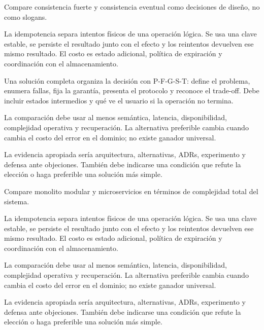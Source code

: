 \documentclass[variant=guia,cover=institutional,mode=screen]{ua-engineering-v6-article}
\begin{document}
\begin{uaexercise}
Compare consistencia fuerte y consistencia eventual como decisiones de diseño, no como slogans.
\end{uaexercise}
\begin{uaanswer}
La idempotencia separa intentos físicos de una operación lógica. Se usa una clave estable, se persiste el resultado junto con el efecto y los reintentos devuelven ese mismo resultado. El costo es estado adicional, política de expiración y coordinación con el almacenamiento.

Una solución completa organiza la decisión con P-F-G-S-T: define el problema, enumera fallas, fija la garantía, presenta el protocolo y reconoce el trade-off. Debe incluir estados intermedios y qué ve el usuario si la operación no termina.

La comparación debe usar al menos semántica, latencia, disponibilidad, complejidad operativa y recuperación. La alternativa preferible cambia cuando cambia el costo del error en el dominio; no existe ganador universal.

La evidencia apropiada sería arquitectura, alternativas, ADRs, experimento y defensa ante objeciones. También debe indicarse una condición que refute la elección o haga preferible una solución más simple.
\end{uaanswer}

\begin{uaexercise}
Compare monolito modular y microservicios en términos de complejidad total del sistema.
\end{uaexercise}
\begin{uaanswer}
La idempotencia separa intentos físicos de una operación lógica. Se usa una clave estable, se persiste el resultado junto con el efecto y los reintentos devuelven ese mismo resultado. El costo es estado adicional, política de expiración y coordinación con el almacenamiento.

La comparación debe usar al menos semántica, latencia, disponibilidad, complejidad operativa y recuperación. La alternativa preferible cambia cuando cambia el costo del error en el dominio; no existe ganador universal.

La evidencia apropiada sería arquitectura, alternativas, ADRs, experimento y defensa ante objeciones. También debe indicarse una condición que refute la elección o haga preferible una solución más simple.
\end{uaanswer}
\end{document}
